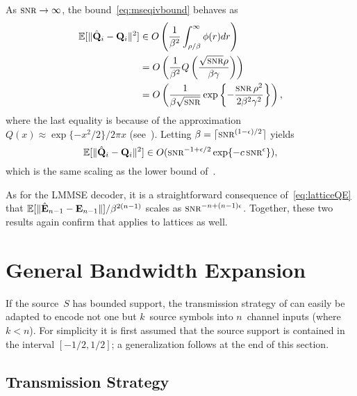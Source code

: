 As $\snr \goesto \infty$, the bound~\eqref{eq:mseqivbound} behaves as
\begin{align*}
  \mseqiv &\in O\left( \frac{1}{\beta^2} \int_{\rho/\beta}^\infty \phi(r) dr 
  \right) \\
  &= O\left( \frac{1}{\beta^2} Q\left( \frac{\sqrt{\snr}\rho}{\beta\gamma}
  \right) \right) \\
  &= O\left( \frac{1}{\beta\sqrt{\snr}} \exp\left\{-\frac{\snr \rho^2}{2 \beta^2
  \gamma^2} \right\} \right),
\end{align*}
where the last equality is because of the approximation $Q(x) \approx
\exp\{-x^2/2\}/2\pi x$ (see~\cite[.12]{AbramowitzS1964}). Letting
$\beta = \lceil \snr^{(1-\e)/2} \rceil$ yields
\begin{equation*}
  \mseqiv \in O(\snr^{-1 + \e/2} \exp\{-c \snr^\e\}),
\end{equation*}
which is the same scaling as the lower bound of~.

As for the LMMSE decoder, it is a straightforward consequence
of~\eqref{eq:latticeQE} that $\mathbb{E}[\|\hat{\mathbf{E}}_{n-1} - \mathbf{E}_{n-1} \|] /
\beta^{2(n-1)}$ scales as $\snr^{-n+(n-1)\e}$. Together, these two results again
confirm that  applies to lattices as well.



\section{General Bandwidth Expansion}\label{sec:genbwexp}

If the source~$S$ has bounded support, the transmission strategy of
 can easily be adapted to encode not one but $k$~source
symbols into $n$~channel inputs (where $k < n$). For simplicity it is first
assumed that the source support is contained in the interval $[-1/2, 1/2]$; a
generalization follows at the end of this section.


\subsection{Transmission Strategy}

